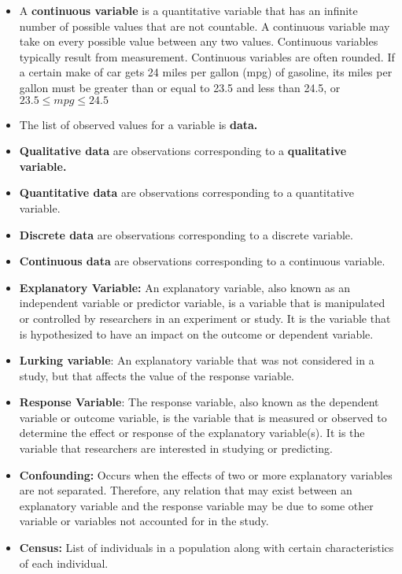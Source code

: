 \documentclass{report}
\begin{document}
\begin{itemize}
        \item A \textbf{continuous variable} is a quantitative variable that has an infinite number of possible values that are not countable. A continuous variable may take on every possible value between any two values. Continuous variables typically result from measurement. Continuous variables are often rounded. If a certain make of car gets 24 miles per gallon (mpg) of gasoline, its miles per gallon must be greater than or equal to 23.5 and less than 24.5, or $23.5 \leq mpg \leq 24.5$
        \item The list of observed values for a variable is \textbf{data.}
        \item \textbf{Qualitative data} are observations corresponding to a \textbf{qualitative variable.}
        \item \textbf{Quantitative data} are observations corresponding to a quantitative variable.
        \item \textbf{Discrete data} are observations corresponding to a discrete variable.
        \item \textbf{Continuous data} are observations corresponding to a continuous variable.
            \item \textbf{Explanatory Variable:} An explanatory variable, also known as an independent variable or predictor variable, is a variable that is manipulated or controlled by researchers in an experiment or study. It is the variable that is hypothesized to have an impact on the outcome or dependent variable. 
            \item \textbf{Lurking variable}: An explanatory variable that was not considered in a study, but that affects the value of the response variable.
            \item \textbf{Response Variable}: The response variable, also known as the dependent variable or outcome variable, is the variable that is measured or observed to determine the effect or response of the explanatory variable(s). It is the variable that researchers are interested in studying or predicting. 
            \item \textbf{Confounding:} Occurs when the effects of two or more explanatory variables are not separated. Therefore, any relation that may exist between an explanatory variable and the response variable may be due to some other variable or variables not accounted for in the study.
            \item \textbf{Census:} List of individuals in a population along with certain characteristics of each individual.

\end{itemize}
\end{document}

